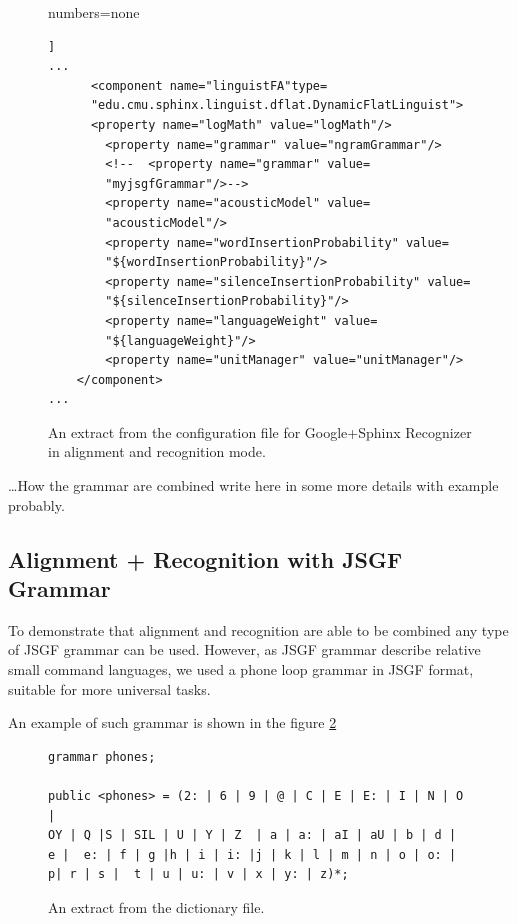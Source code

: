 \begin{figure}[htbp]
  \centering 
 
{numbers=none}  
\lstset{language=XML}  
\begin{lstlisting}[frame=single]]
...
      <component name="linguistFA"type=
      "edu.cmu.sphinx.linguist.dflat.DynamicFlatLinguist"> 
      <property name="logMath" value="logMath"/>
        <property name="grammar" value="ngramGrammar"/> 
        <!--  <property name="grammar" value=
        "myjsgfGrammar"/>--> 
        <property name="acousticModel" value=
        "acousticModel"/>
        <property name="wordInsertionProbability" value=
        "${wordInsertionProbability}"/>
        <property name="silenceInsertionProbability" value=
        "${silenceInsertionProbability}"/>
        <property name="languageWeight" value=
        "${languageWeight}"/>
        <property name="unitManager" value="unitManager"/>
    </component>
...
\end{lstlisting} 
 \caption{An extract from the configuration file for Google+Sphinx Recognizer in
 alignment and recognition mode.}
  \label{fig:conf_al_rec}
\end {figure}


\ldots How the grammar are combined write here in some more details with example
probably. 

\subsection {Alignment + Recognition with JSGF Grammar}
To demonstrate that alignment and recognition are able to be combined any
type of JSGF grammar can be used. However, as JSGF grammar describe 
relative small command languages, we used a phone loop grammar in JSGF format,
suitable for more universal tasks.

An example of such grammar is shown in the figure   \ref{fig:phone_loop}

\begin{figure}[htbp]
\lstset{language=XML} 
%  
%  
\begin{lstlisting}[frame=single]
grammar phones;

public <phones> = (2: | 6 | 9 | @ | C | E | E: | I | N | O |
OY | Q |S | SIL | U | Y | Z  | a | a: | aI | aU | b | d |
e |  e: | f | g |h | i | i: |j | k | l | m | n | o | o: |
p| r | s |  t | u | u: | v | x | y: | z)*;
\end{lstlisting}
 \caption{An extract from the dictionary file.}
  \label{fig:phone_loop}
\end {figure}


